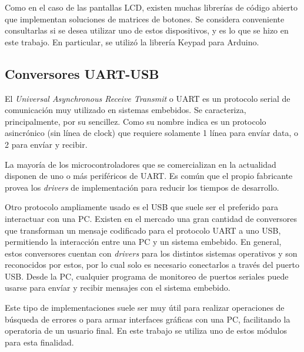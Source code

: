 Como en el caso de las pantallas LCD, existen muchas librerías de código abierto que implementan soluciones de matrices de botones. Se considera conveniente consultarlas si se desea utilizar uno de estos dispositivos, y es lo que se hizo en este trabajo. En particular, se utilizó la librería Keypad para Arduino\citep{web_repo_keypad}.

\subsection{Conversores UART-USB}
\label{conversor_usb}
El \textit{Universal Asynchronous Receive Transmit} o UART es un protocolo serial de comunicación muy utilizado en sistemas embebidos. Se caracteriza, principalmente, por su sencillez. Como su nombre indica es un protocolo asincrónico (sin línea de clock) que requiere solamente 1 línea para envíar data, o 2 para envíar y recibir.

La mayoría de los microcontroladores que se comercializan en la actualidad disponen de uno o más periféricos de UART. Es común que el propio fabricante provea los \textit{drivers} de implementación para reducir los tiempos de desarrollo.

Otro protocolo ampliamente usado es el USB que suele ser el preferido para interactuar con una PC. Existen en el mercado una gran cantidad de conversores que transforman un mensaje codificado para el protocolo UART a uno USB, permitiendo la interacción entre una PC y un sistema embebido. En general, estos conversores cuentan con \textit{drivers} para los distintos sistemas operativos y son reconocidos por estos, por lo cual solo es necesario conectarlos a través del puerto USB. Desde la PC, cualquier programa de monitoreo de puertos seriales puede usarse para envíar y recibir mensajes con el sistema embebido.

Este tipo de implementaciones suele ser muy útil para realizar operaciones de búsqueda de errores o para armar interfaces gráficas con una PC, facilitando la operatoria de un usuario final. En este trabajo se utiliza uno de estos módulos para esta finalidad.
